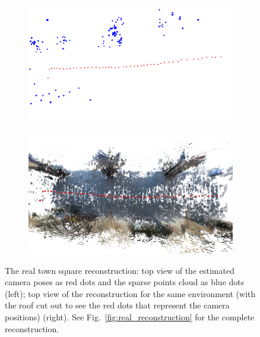 \begin{figure}[h]
\centering
	\begin{subfigure}{0.45\linewidth}
		\centering
		\includegraphics[width=\linewidth]{img/real2.png}
	\end{subfigure}
	\begin{subfigure}{0.45\linewidth}
		\centering
		\includegraphics[width=\linewidth]{img/real3.png}
	\end{subfigure}
	\caption{The real town square reconstruction: top view of 
	the estimated camera poses as red dots and the sparse
	points cloud as blue dots (left); top view of the reconstruction for the
	same environment (with the roof cut out to see the red dots that represent
	the camera positions) (right). See Fig.~\ref{fig:real_reconstruction} for
	the complete reconstruction.}
	\label{fig:reconstruction_steps}
\end{figure}
%
